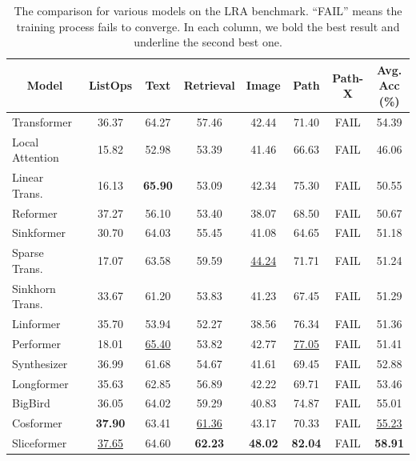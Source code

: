 \begin{table}[t]
  \centering
  \caption{The comparison for various models on the LRA benchmark. 
  ``FAIL'' means the training process fails to converge.
  In each column, we bold the best result and underline the second best one.}
  \small{
    \begin{tabular}{l|cccccc|c}
    \toprule
    \multicolumn{1}{c|}{Model} & ListOps & Text  & Retrieval & Image & Path  & Path-X & Avg. Acc (\%)\\
    \midrule
    Transformer~\cite{vaswani2017attention} & 36.37 & 64.27 & 57.46 & 42.44 & 71.40 & FAIL  & 54.39 \\
    \midrule
    Local Attention~\cite{tay2021long} & 15.82 & 52.98 & 53.39 & 41.46 & 66.63 & FAIL  & 46.06 \\
    Linear Trans.~\cite{katharopoulos2020transformers} & 16.13 & \textbf{65.90} & 53.09 & 42.34 & 75.30 & FAIL  & 50.55 \\
    Reformer~\cite{kitaev2020reformer}  & 37.27 & 56.10 & 53.40 & 38.07 & 68.50 & FAIL  & 50.67 \\
    Sinkformer~\cite{sander2022sinkformers} & 30.70 & 64.03 &  55.45 & 41.08 & 64.65 & FAIL & 51.18 \\
    Sparse Trans.~\cite{child2019generating} & 17.07 & 63.58 & 59.59& \underline{44.24} & 71.71 & FAIL  & 51.24 \\
    Sinkhorn Trans.~\cite{tay2020sparse} & 33.67 & 61.20 & 53.83 & 41.23 & 67.45 & FAIL  & 51.29 \\
    Linformer~\cite{wang2020linformer} & 35.70 & 53.94 & 52.27 & 38.56 & 76.34 & FAIL  & 51.36 \\
    Performer~\cite{choromanski2021rethinking} & 18.01 & \underline{65.40} & 53.82 & 42.77 & \underline{77.05} & FAIL  & 51.41 \\
    Synthesizer~\cite{tay2021synthesizer} & 36.99 & 61.68 & 54.67 & 41.61 & 69.45 & FAIL  & 52.88 \\
    Longformer~\cite{beltagy2020longformer} & 35.63 & 62.85 & 56.89 & 42.22 & 69.71 & FAIL  & 53.46 \\
    BigBird~\cite{zaheer2020big} & 36.05 & 64.02 & 59.29 & 40.83 & 74.87 & FAIL  & 55.01 \\
    Cosformer~\cite{zhen2022cosformer} & \textbf{37.90} & 63.41 & \underline{61.36} & 43.17 & 70.33 & FAIL  & \underline{55.23} \\
    \midrule
    Sliceformer & \underline{37.65} &  64.60     &  \textbf{62.23}     &   \textbf{48.02}    &  \textbf{82.04}      &   FAIL  & \textbf{58.91}  \\
    \bottomrule
    \end{tabular}%
  \label{tab:lra_res}%
  }
\end{table}%



